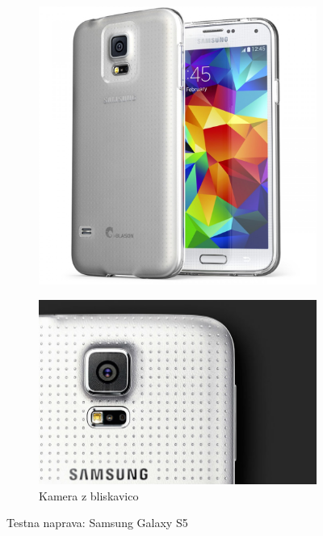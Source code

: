 \documentclass[a4paper, 12pt]{book}
\begin{document}
\begin{figure}[!ht]
    \centering
    \begin{subfigure}[b]{0.4\textwidth}
        \includegraphics[width=\textwidth]{sgs5full}
    \end{subfigure}
    \begin{subfigure}[b]{0.4\textwidth}
        \includegraphics[width=\textwidth]{sgs5camera}
        \caption{Kamera z bliskavico}
    \end{subfigure}
    \caption{Testna naprava: Samsung Galaxy S5}
    \label{fig:sgs5}
\end{figure}
\end{document}
